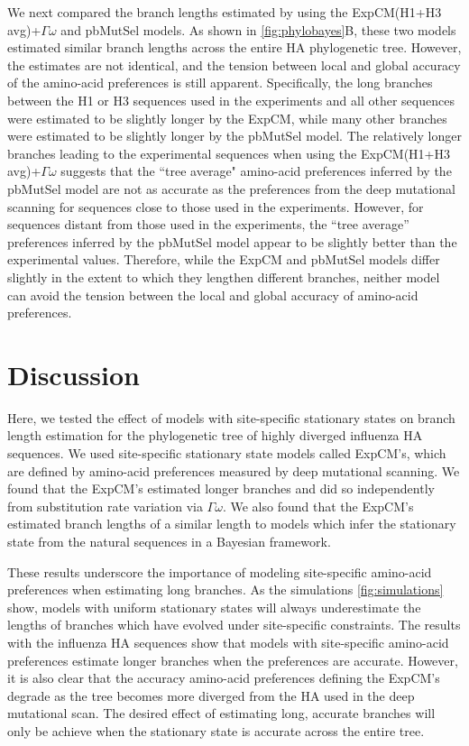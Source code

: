 \documentclass[11pt]{article}
\begin{document}
We next compared the branch lengths estimated by using the ExpCM(H1+H3 avg)+$\Gamma\omega$ and pbMutSel models.
As shown in \ref{fig:phylobayes}B, these two models estimated similar branch lengths across the entire HA phylogenetic tree. 
However, the estimates are not identical, and the tension between local and global accuracy of the amino-acid preferences is still apparent. 
Specifically, the long branches between the H1 or H3 sequences used in the experiments and all other sequences were estimated to be slightly longer by the ExpCM, while many other branches were estimated to be slightly longer by the pbMutSel model. 
The relatively longer branches leading to the experimental sequences when using the ExpCM(H1+H3 avg)+$\Gamma\omega$ suggests that the ``tree average" amino-acid preferences inferred by the pbMutSel model are not as accurate as the preferences from the deep mutational scanning for sequences close to those used in the experiments. 
However, for sequences distant from those used in the experiments, the ``tree average'' preferences inferred by the pbMutSel model appear to be slightly better than the experimental values.
Therefore, while the ExpCM and pbMutSel models differ slightly in the extent to which they lengthen different branches, neither model can avoid the tension between the local and global accuracy of amino-acid preferences. 

\section*{Discussion}
  
Here, we tested the effect of models with site-specific stationary states on branch length estimation for the phylogenetic tree of highly diverged influenza HA sequences. 
We used site-specific stationary state models called ExpCM's, which are defined by amino-acid preferences measured by deep mutational scanning. 
We found that the ExpCM's estimated longer branches and did so independently from substitution rate variation via $\Gamma\omega$. 
We also found that the ExpCM's estimated branch lengths of a similar length to models which infer the stationary state from the natural sequences in a Bayesian framework.  

These results underscore the importance of modeling site-specific amino-acid preferences when estimating long branches. 
As the simulations \ref{fig:simulations} show, models with uniform stationary states will always underestimate the lengths of branches which have evolved under site-specific constraints. 
The results with the influenza HA sequences show that models with site-specific amino-acid preferences estimate longer branches when the preferences are accurate. 
However, it is also clear that the accuracy amino-acid preferences defining the ExpCM's degrade as the tree becomes more diverged from the HA used in the deep mutational scan. 
The desired effect of estimating long, accurate branches will only be achieve when the stationary state is accurate across the entire tree. 
\end{document}
